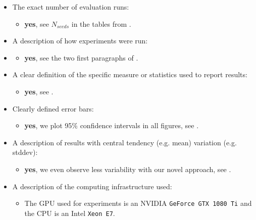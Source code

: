 \begin{itemize}
    \item The exact number of evaluation runs:

    \begin{itemize}
        \item \textbf{yes}, see $N_{seeds}$ in the tables from .
    \end{itemize}

    \item A description of how experiments were run:
    \item
    \begin{itemize}
        \item \textbf{yes}, see the two first paragraphs of .
    \end{itemize}

    \item A clear definition of the specific measure or statistics used to report results:
    \begin{itemize}
        \item  \textbf{yes}, see .
    \end{itemize}

    \item Clearly defined error bars:

    \begin{itemize}
        \item  \textbf{yes}, we plot 95\% confidence intervals in all figures, see .
    \end{itemize}

    \item A description of results with central tendency (e.g. mean)  variation (e.g. stddev):

    \begin{itemize}
        \item  \textbf{yes}, we even observe less variability with our novel approach, see .
    \end{itemize}
    \item A description of the computing infrastructure used:
    \begin{itemize}
        \item The \gls{GPU} used for experiments is an NVIDIA \texttt{GeForce GTX 1080 Ti} and the \gls{CPU} is an Intel \texttt{Xeon E7}.
    \end{itemize}
\end{itemize}